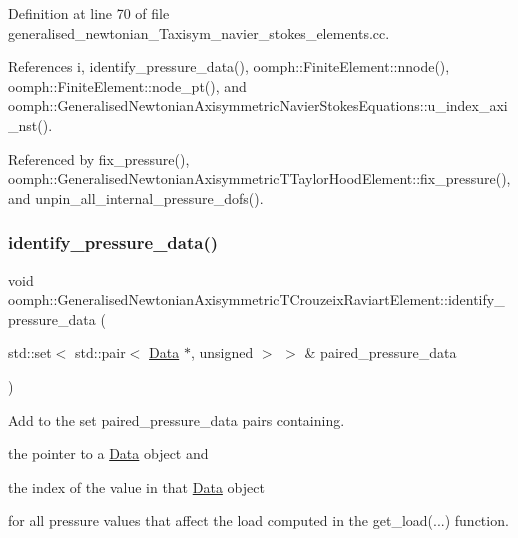 Definition at line 70 of file generalised\+\_\+newtonian\+\_\+\+Taxisym\+\_\+navier\+\_\+stokes\+\_\+elements.\+cc.



References i, identify\+\_\+pressure\+\_\+data(), oomph\+::\+Finite\+Element\+::nnode(), oomph\+::\+Finite\+Element\+::node\+\_\+pt(), and oomph\+::\+Generalised\+Newtonian\+Axisymmetric\+Navier\+Stokes\+Equations\+::u\+\_\+index\+\_\+axi\+\_\+nst().



Referenced by fix\+\_\+pressure(), oomph\+::\+Generalised\+Newtonian\+Axisymmetric\+T\+Taylor\+Hood\+Element\+::fix\+\_\+pressure(), and unpin\+\_\+all\+\_\+internal\+\_\+pressure\+\_\+dofs().

\mbox{\label{classoomph_1_1GeneralisedNewtonianAxisymmetricTCrouzeixRaviartElement_a59c693fd6a19fd39627776cd68ba0382}} 
\subsubsection{\texorpdfstring{identify\+\_\+pressure\+\_\+data()}{identify\_pressure\_data()}}
{\footnotesize\ttfamily void oomph\+::\+Generalised\+Newtonian\+Axisymmetric\+T\+Crouzeix\+Raviart\+Element\+::identify\+\_\+pressure\+\_\+data (\begin{DoxyParamCaption}\item[{std\+::set$<$ std\+::pair$<$ \hyperlink{classoomph_1_1Data}{Data} $\ast$, unsigned $>$ $>$ \&}]{paired\+\_\+pressure\+\_\+data }\end{DoxyParamCaption})}



Add to the set {\ttfamily paired\+\_\+pressure\+\_\+data} pairs containing. 


\begin{DoxyItemize}
\item the pointer to a \hyperlink{classoomph_1_1Data}{Data} object and
\item the index of the value in that \hyperlink{classoomph_1_1Data}{Data} object
\end{DoxyItemize}for all pressure values that affect the load computed in the {\ttfamily get\+\_\+load}(...) function.

